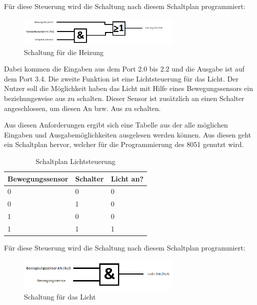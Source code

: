 Für diese Steuerung wird die Schaltung nach diesem Schaltplan programmiert:

\begin{figure}[htbp] 
  \centering
     \includegraphics[width=0.7\textwidth]{Heizungsschaltung.png}
  \caption{Schaltung für die Heizung}
  \label{fig:Bild1}
\end{figure}

Dabei kommen die Eingaben aus dem Port 2.0 bis 2.2 und die Ausgabe ist auf dem Port 3.4.
Die zweite Funktion ist eine Lichtsteuerung für das Licht. Der Nutzer soll die Möglichkeit haben das Licht mit Hilfe eines Bewegungssensors ein beziehungsweise aus zu schalten. Dieser Sensor ist zusätzlich an einen Schalter angeschlossen, um diesen An bzw. Aus zu schalten.
 
Aus diesen Anforderungen ergibt sich eine Tabelle aus der alle möglichen Eingaben und Ausgabemöglichkeiten ausgelesen werden können. Aus diesen geht ein Schaltplan hervor, welcher für die Programmierung des 8051 genutzt wird.

\begin{table}[]
\centering
\caption{Schaltplan Lichtsteuerung}
\label{my-label}
\begin{tabular}{|l|l|l|}
\hline
\multicolumn{1}{|c|}{\textbf{Bewegungssensor}} & \multicolumn{1}{c|}{\textbf{Schalter}} & \multicolumn{1}{c|}{\textbf{Licht an?}} \\ \hline
 0 & 0 & 0 \\ \hline
 0 & 1 & 0 \\ \hline
 1 & 0 & 0 \\ \hline
 1 & 1 & 1 \\ \hline
\end{tabular}
\end{table}

Für diese Steuerung wird die Schaltung nach diesem Schaltplan programmiert:

\begin{figure}[htbp] 
  \centering
     \includegraphics[width=0.7\textwidth]{Lichtschaltung.png}
  \caption{Schaltung für das Licht}
  \label{fig:Bild2}
\end{figure}

